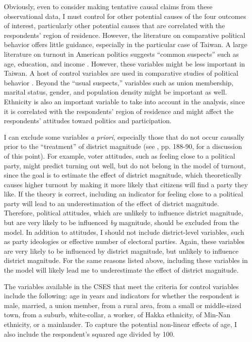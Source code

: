 \documentclass[12pt]{article}
\begin{document}
Obviously, even to consider making tentative causal claims from these observational data, I must control for other potential causes of the four outcomes of interest, particularly other potential causes that are correlated with the respondents' region of residence. However, the literature on comparative political behavior offers little guidance, especially in the particular case of Taiwan. A large literature on turnout in American politics suggests ``common suspects'' such as age, education, and income \citep{Campbelletal1960, RosenstoneHansen1993}. However, these variables might be less important in Taiwan. A host of control variables are used in comparative studies of political behavior \citep[e.g.][]{KarpBanducci2008, Blais2000}. Beyond the ``usual suspects,'' variables such as union membership, marital status, gender, and population density might be important as well. Ethnicity is also an important variable to take into account in the analysis, since it is correlated with the respondents' region of residence and might affect the respondents' attitudes toward politics and participation.

I can exclude some variables \textit{a priori}, especially those that do not occur causally prior to the ``treatment'' of district magnitude (see \citealt{GelmanHill2007}, pp. 188-90, for a discussion of this point). For example, voter attitudes, such as feeling close to a political party, might predict turning out well, but do not belong in the model of turnout, since the goal is to estimate the effect of district magnitude, which theoretically causes higher turnout by making it more likely that citizens will find a party they like. If the theory is correct, including an indicator for feeling close to a political party will lead to an underestimation of the effect of district magnitude. Therefore, political attitudes, which are unlikely to influence district magnitude, but are very likely to be influenced \textit{by} magnitude, should be excluded from the model. In addition to attitudes, I should not include district-level variables, such as party ideologies or effective number of electoral parties. Again, these variables are very likely to be influenced by district magnitude, but unlikely to influence district magnitude. For the same reasons listed above, including these variables in the model will likely lead me to underestimate the effect of district magnitude. 

The variables available in the CSES that meet the criteria for control variables include the following: age in years and indicators for whether the respondent is male, married, a union member, from a rural area, from a small or middle-sized town, from a suburb, white-collar, a worker, of Hakka ethnicity, of Min-Nan ethnicity, or  a mainlander. To capture the potential non-linear effects of age, I also include the respondent's squared age divided by 100.
\end{document}
